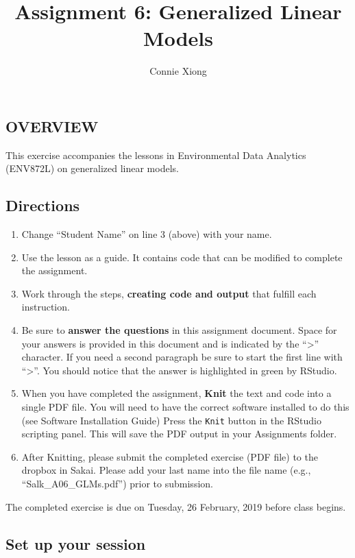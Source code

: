\documentclass[]{article}
\title{Assignment 6: Generalized Linear Models}
\author{Connie Xiong}
\date{}
\providecommand{\tightlist}{%
  \setlength{\itemsep}{0pt}\setlength{\parskip}{0pt}}
\begin{document}
\maketitle

\subsection{OVERVIEW}\label{overview}

This exercise accompanies the lessons in Environmental Data Analytics
(ENV872L) on generalized linear models.

\subsection{Directions}\label{directions}

\begin{enumerate}
\def\labelenumi{\arabic{enumi}.}
\tightlist
\item
  Change ``Student Name'' on line 3 (above) with your name.
\item
  Use the lesson as a guide. It contains code that can be modified to
  complete the assignment.
\item
  Work through the steps, \textbf{creating code and output} that fulfill
  each instruction.
\item
  Be sure to \textbf{answer the questions} in this assignment document.
  Space for your answers is provided in this document and is indicated
  by the ``\textgreater{}'' character. If you need a second paragraph be
  sure to start the first line with ``\textgreater{}''. You should
  notice that the answer is highlighted in green by RStudio.
\item
  When you have completed the assignment, \textbf{Knit} the text and
  code into a single PDF file. You will need to have the correct
  software installed to do this (see Software Installation Guide) Press
  the \texttt{Knit} button in the RStudio scripting panel. This will
  save the PDF output in your Assignments folder.
\item
  After Knitting, please submit the completed exercise (PDF file) to the
  dropbox in Sakai. Please add your last name into the file name (e.g.,
  ``Salk\_A06\_GLMs.pdf'') prior to submission.
\end{enumerate}

The completed exercise is due on Tuesday, 26 February, 2019 before class
begins.

\subsection{Set up your session}\label{set-up-your-session}
\end{document}
